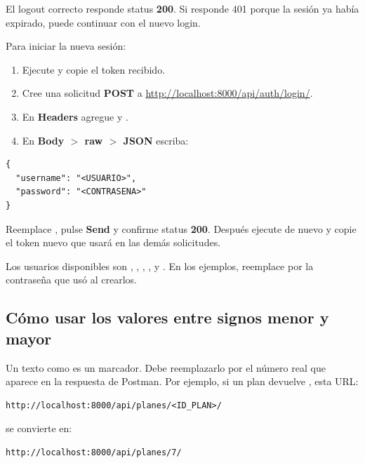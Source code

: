 \documentclass[11pt,a4paper]{article}
\begin{document}
El logout correcto responde status \textbf{200}. Si responde 401 porque la sesión ya había expirado, puede continuar con el nuevo login.

Para iniciar la nueva sesión:

\begin{enumerate}
  \item Ejecute  y copie el token recibido.
  \item Cree una solicitud \textbf{POST} a \url{http://localhost:8000/api/auth/login/}.
  \item En \textbf{Headers} agregue  y .
  \item En \textbf{Body $>$ raw $>$ JSON} escriba:
\end{enumerate}

\begin{lstlisting}
{
  "username": "<USUARIO>",
  "password": "<CONTRASENA>"
}
\end{lstlisting}

Reemplace , pulse \textbf{Send} y confirme status \textbf{200}. Después ejecute de nuevo  y copie el token nuevo que usará en las demás solicitudes.

Los usuarios disponibles son , , , ,  y . En los ejemplos, reemplace  por la contraseña que usó al crearlos.

\subsection{Cómo usar los valores entre signos menor y mayor}

Un texto como  es un marcador. Debe reemplazarlo por el número real que aparece en la respuesta de Postman. Por ejemplo, si un plan devuelve , esta URL:

\begin{lstlisting}
http://localhost:8000/api/planes/<ID_PLAN>/
\end{lstlisting}

se convierte en:

\begin{lstlisting}
http://localhost:8000/api/planes/7/
\end{lstlisting}
\end{document}
